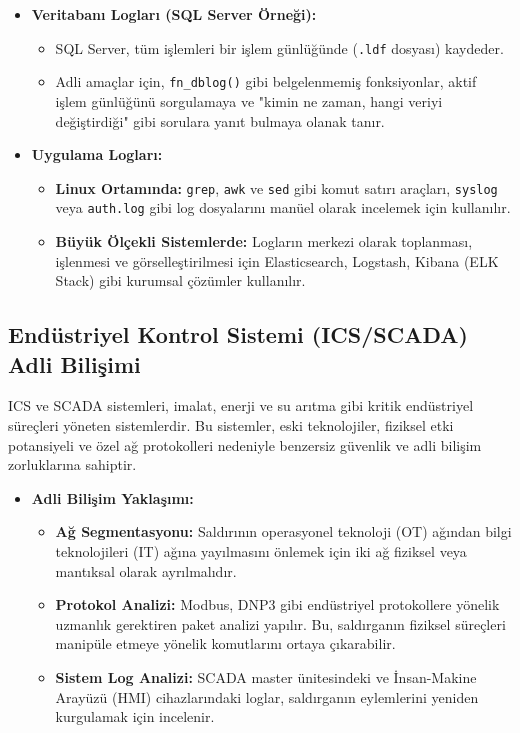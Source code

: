 \begin{itemize}
\begin{itemize}
\begin{itemize}
    \item \textbf{Veritabanı Logları (SQL Server Örneği):}
    \begin{itemize}
        \item SQL Server, tüm işlemleri bir işlem günlüğünde (\texttt{.ldf} dosyası) kaydeder.
        \item Adli amaçlar için, \texttt{fn\_dblog()} gibi belgelenmemiş fonksiyonlar, aktif işlem günlüğünü sorgulamaya ve "kimin ne zaman, hangi veriyi değiştirdiği" gibi sorulara yanıt bulmaya olanak tanır.
    \end{itemize}
    \item \textbf{Uygulama Logları:}
    \begin{itemize}
        \item \textbf{Linux Ortamında:} \texttt{grep}, \texttt{awk} ve \texttt{sed} gibi komut satırı araçları, \texttt{syslog} veya \texttt{auth.log} gibi log dosyalarını manüel olarak incelemek için kullanılır.
        \item \textbf{Büyük Ölçekli Sistemlerde:} Logların merkezi olarak toplanması, işlenmesi ve görselleştirilmesi için Elasticsearch, Logstash, Kibana (ELK Stack) gibi kurumsal çözümler kullanılır.
    \end{itemize}
\end{itemize}

\subsection{Endüstriyel Kontrol Sistemi (ICS/SCADA) Adli Bilişimi}

ICS ve SCADA sistemleri, imalat, enerji ve su arıtma gibi kritik endüstriyel süreçleri yöneten sistemlerdir. Bu sistemler, eski teknolojiler, fiziksel etki potansiyeli ve özel ağ protokolleri nedeniyle benzersiz güvenlik ve adli bilişim zorluklarına sahiptir.

\begin{itemize}
    \item \textbf{Adli Bilişim Yaklaşımı:}
    \begin{itemize}
        \item \textbf{Ağ Segmentasyonu:} Saldırının operasyonel teknoloji (OT) ağından bilgi teknolojileri (IT) ağına yayılmasını önlemek için iki ağ fiziksel veya mantıksal olarak ayrılmalıdır.
        \item \textbf{Protokol Analizi:} Modbus, DNP3 gibi endüstriyel protokollere yönelik uzmanlık gerektiren paket analizi yapılır. Bu, saldırganın fiziksel süreçleri manipüle etmeye yönelik komutlarını ortaya çıkarabilir.
        \item \textbf{Sistem Log Analizi:} SCADA master ünitesindeki ve İnsan-Makine Arayüzü (HMI) cihazlarındaki loglar, saldırganın eylemlerini yeniden kurgulamak için incelenir.
    \end{itemize}
\end{itemize}


\end{itemize}
\end{itemize}
